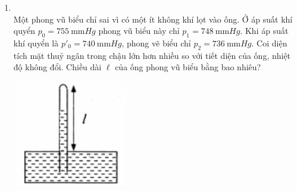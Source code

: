 \begin{enumerate}[label=\bfseries Câu \arabic*:, leftmargin=1.7cm]
\item {}\\
Một phong vũ biểu chỉ sai vì có một ít không khí lọt vào ống. Ở áp suất khí quyển $p_0=\SI{755}{\milli\meter Hg}$ phong vũ biểu này chỉ $p_1=\SI{748}{\milli\meter Hg}$. Khi áp suất khí quyển là $p'_0=\SI{740}{\milli\meter Hg}$, phong vẽ biểu chỉ $p_2=\SI{736}{\milli\meter Hg}$. Coi diện tích mặt thuỷ ngân trong chậu lớn hơn nhiều so với tiết diện của ống, nhiệt độ không đổi. Chiều dài $\ell$ của ống phong vũ biểu bằng bao nhiêu?
\begin{center}
	\includegraphics[width=0.2\linewidth]{../figs/VN12-Y24-PH-SYL-010P-9}
\end{center}



\end{enumerate}
